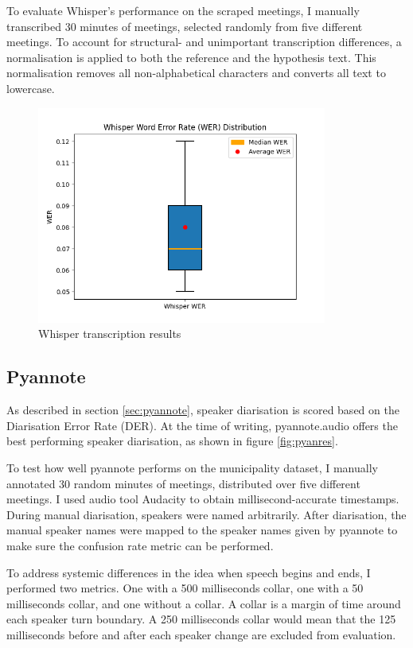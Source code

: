\documentclass[twoside]{uva-inf-bachelor-thesis}
\begin{document}
To evaluate Whisper's performance on the scraped meetings, I manually transcribed 30 minutes of meetings, selected randomly from five different meetings. To account for structural- and unimportant transcription differences, a normalisation is applied to both the reference and the hypothesis text. 
This normalisation removes all non-alphabetical characters and converts all text to lowercase. 

\begin{figure}
    \centering
    \includegraphics[width=0.85\textwidth]{images/whisperBench.png}
    \caption{Whisper transcription results}
    \label{fig:whisperExperiment}
\end{figure}

\subsection{Pyannote}
As described in section \ref{sec:pyannote}, speaker diarisation is scored based on the Diarisation Error Rate (DER). At the time of writing, pyannote.audio offers the best performing speaker diarisation, as shown in figure \ref{fig:pyanres}. 

To test how well pyannote performs on the municipality dataset, I manually annotated 30 random minutes of meetings, distributed over five different meetings. I used audio tool Audacity to obtain millisecond-accurate timestamps. During manual diarisation, speakers were named arbitrarily. After diarisation, the manual speaker names were mapped to the speaker names given by pyannote to make sure the confusion rate metric can be performed.

To address systemic differences in the idea when speech begins and ends, I performed two metrics. One with a 500 milliseconds collar, one with a 50 milliseconds collar, and one without a collar. 
A collar is a margin of time around each speaker turn boundary. A 250 milliseconds collar would mean that the 125 milliseconds before and after each speaker change are excluded from evaluation.
\end{document}
